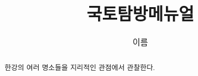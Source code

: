 \documentclass[chapter, oneside]{oblivoir}
\title{국토탐방메뉴얼}
\author{이름}
\begin{document}
    \maketitle
    \begin{abstract}
    한강의 여러 명소들을 지리적인 관점에서 관찰한다.
    \end{abstract}
    \newpage
    \tableofcontents
    
    
    
\end{document}
